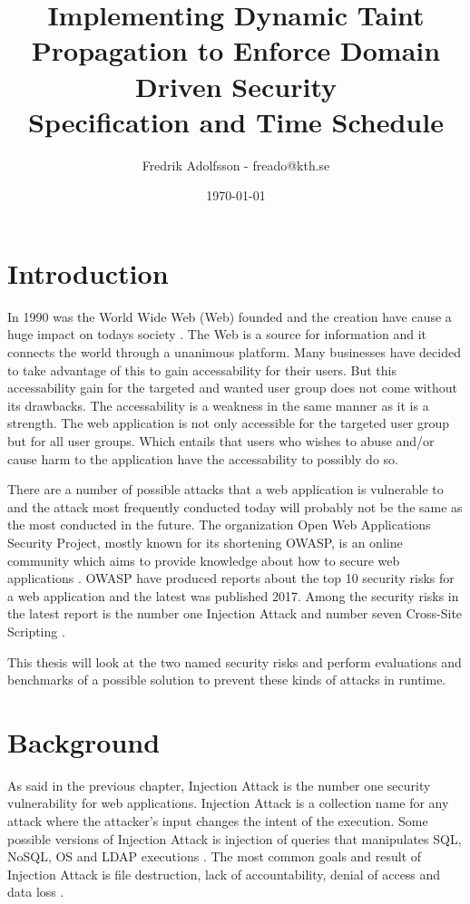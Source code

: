 \documentclass{../kththesis}
\title{Implementing Dynamic Taint Propagation to Enforce Domain Driven Security \\
        \large Specification and Time Schedule}
\author{Fredrik Adolfsson - freado@kth.se}
\date{\today}
\begin{document}
\frontmatter


\titlepage


\tableofcontents


\mainmatter



\chapter{Introduction}
In 1990 was the World Wide Web (Web) founded and the creation have cause a huge impact on todays society \parencite{www}. The Web is a source for information and it connects the world through a unanimous platform. Many businesses have decided to take advantage of this to gain accessability for their users. But this accessability gain for the targeted and wanted user group does not come without its drawbacks. The accessability is a weakness in the same manner as it is a strength. The web application is not only accessible for the targeted user group but for all user groups. Which entails that users who wishes to abuse and/or cause harm to the application have the accessability to possibly do so. 

There are a number of possible attacks that a web application is vulnerable to and the attack most frequently conducted today will probably not be the same as the most conducted in the future. The organization Open Web Applications Security Project, mostly known for its shortening OWASP, is an online community which aims to provide knowledge about how to secure web applications \parencite{OpenWebApplicationSecurityProject}. OWASP have produced reports about the top 10 security risks for a web application and the latest was published 2017. Among the security risks in the latest report is the number one Injection Attack and number seven Cross-Site Scripting \parencite{OWASP2017, OpenWebApplicationSecurityProject, CrossMichael2007Dgtw}.

This thesis will look at the two named security risks and perform evaluations and benchmarks of a possible solution to prevent these kinds of attacks in runtime. 



\chapter{Background}
As said in the previous chapter, Injection Attack is the number one security vulnerability for web applications. Injection Attack is a collection name for any attack where the attacker's input changes the intent of the execution. Some possible versions of Injection Attack is injection of queries that manipulates SQL, NoSQL, OS and LDAP executions \parencite{OWASP2017}. The most common goals and result of Injection Attack is file destruction, lack of accountability, denial of access and data loss \parencite{Secure_Web}.
\end{document}
